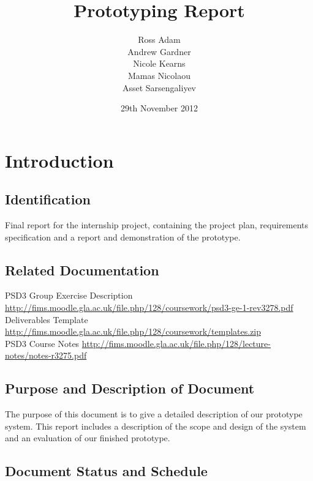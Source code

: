 \documentclass{l3deliverable}
\title{Prototyping Report}
\author{Ross Adam \\
        Andrew Gardner \\
        Nicole Kearns \\
        Mamas Nicolaou\\
	Asset Sarsengaliyev\\}
\date{29th November 2012}
\begin{document}

\maketitle

\tableofcontents

\newpage


\section{Introduction}

\subsection{Identification}
Final report for the internship project, containing the project plan, requirements specification and a report and demonstration of the prototype.

\subsection{Related Documentation}

PSD3 Group Exercise Description \url{http://fims.moodle.gla.ac.uk/file.php/128/coursework/psd3-ge-1-rev3278.pdf}\\

Deliverables Template \url{http://fims.moodle.gla.ac.uk/file.php/128/coursework/templates.zip}\\

PSD3 Course Notes \url{http://fims.moodle.gla.ac.uk/file.php/128/lecture-notes/notes-r3275.pdf}\\

\subsection{Purpose and Description of Document}
The purpose of this document is to give a detailed description of our
prototype system. This report includes a description of the scope and
design of the system and an evaluation of our finished prototype.
\subsection{Document Status and Schedule}
\end{document}
